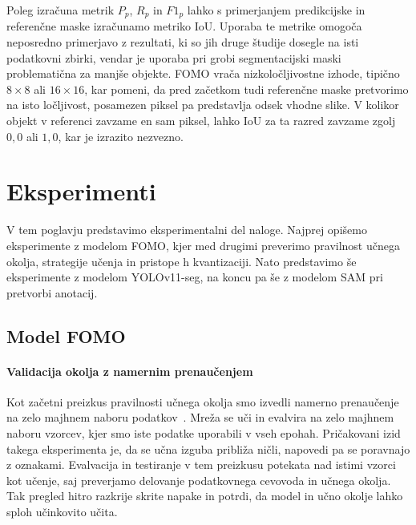 \documentclass[a4paper,twoside,openright,12pt,slovene]{book}
\begin{document}
            Poleg izračuna metrik $P_p$, $R_p$ in $F1_p$ lahko s primerjanjem
            predikcijske in referenčne maske izračunamo metriko IoU.
            Uporaba te metrike omogoča neposredno primerjavo z rezultati,
            ki so jih druge študije dosegle na isti podatkovni zbirki, vendar
            je uporaba pri grobi segmentacijski maski problematična za manjše
            objekte. FOMO vrača nizkoločljivostne izhode, tipično \(8\times 8\)
            ali \(16\times 16\), kar pomeni, da pred začetkom tudi referenčne
            maske pretvorimo na isto ločljivost, posamezen piksel pa
            predstavlja odsek vhodne slike. V kolikor objekt v referenci
            zavzame en sam piksel, lahko IoU za ta razred zavzame zgolj $0{,}0$
            ali $1{,}0$, kar je izrazito nezvezno.

    \section{Eksperimenti} \label{sct:eir-eksperimenti}

        V tem poglavju predstavimo eksperimentalni del naloge. Najprej opišemo
        eksperimente z modelom FOMO, kjer med drugimi preverimo pravilnost učnega
        okolja, strategije učenja in pristope h kvantizaciji. Nato predstavimo še
        eksperimente z modelom YOLOv11-seg, na koncu pa še z modelom SAM pri
        pretvorbi anotacij.

        \subsection{Model FOMO} \label{sct:eksperimenti-fomo}


            \paragraph{Validacija okolja z namernim prenaučenjem} \label{sct:eir-eksperimenti-validacija}

            Kot začetni preizkus pravilnosti učnega okolja smo izvedli namerno
            prenaučenje na zelo majhnem naboru
            podatkov~\cite{src:karpathy2019recipe}. Mreža se uči in
            evalvira na zelo majhnem naboru vzorcev, kjer smo iste podatke uporabili
            v vseh epohah. Pričakovani izid takega eksperimenta je, da se učna izguba približa
            ničli, napovedi pa se poravnajo z oznakami. Evalvacija in
            testiranje v tem preizkusu potekata nad istimi vzorci kot
            učenje, saj preverjamo delovanje podatkovnega cevovoda in
            učnega okolja. Tak pregled hitro razkrije skrite napake in
            potrdi, da model in učno okolje lahko sploh učinkovito učita.
\end{document}
